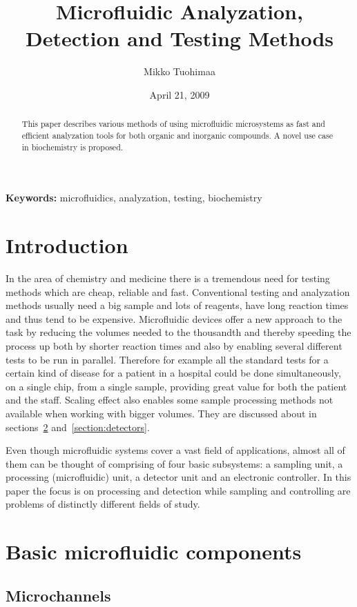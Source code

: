 \documentclass[12pt]{article}
\title{Microfluidic Analyzation, Detection and Testing Methods}
\author{Mikko Tuohimaa}
\date{April 21, 2009}
\begin{document}
\maketitle
{}
\setcounter{page}{1}
\begin{abstract}
This paper describes various methods of using microfluidic microsystems as 
fast and efficient analyzation
tools for both organic and inorganic compounds. A novel use case in biochemistry
is proposed.
\end{abstract}

\textbf{Keywords:} microfluidics, analyzation, testing, biochemistry

\section{Introduction}
In the area of chemistry and medicine there is a tremendous need for testing methods which are 
cheap, reliable and fast. Conventional testing and analyzation methods usually need a big 
sample and lots of reagents, have long reaction times and thus tend to be expensive. 
Microfluidic devices offer 
a new approach to the task by reducing the volumes needed to the thousandth and thereby 
speeding the process up both by shorter reaction times and also by enabling several different
tests to be run in parallel. Therefore for example all the standard tests for a certain kind of 
disease for a patient in a hospital could be done simultaneously, on a single chip, from a single
sample, providing great value for both the patient and the staff. Scaling effect also enables some sample processing methods not 
available when working with bigger volumes. They are discussed about in 
sections~\ref{section:components} and~\ref{section:detectors}.

Even though microfluidic systems cover a vast field of applications, almost all of them can be
thought of comprising of four basic subsystems: a sampling unit, a processing (microfluidic) 
unit, a detector unit and an electronic controller. In this paper the focus is on processing and
detection while sampling and controlling are problems of distinctly different fields of study.

\section{Basic microfluidic components}\label{section:components}

\subsection{Microchannels}
\end{document}
